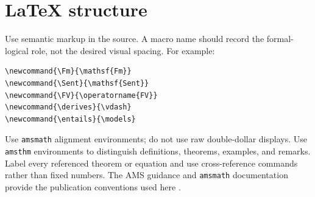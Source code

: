 \section{LaTeX structure}
\label{sec:latex-style-03}

Use semantic markup in the source.  A macro name should record the formal-logical
role, not the desired visual spacing.  For example:
\begin{lstlisting}[language={[LaTeX]TeX},caption={Semantic macros for logic}]
\newcommand{\Fm}{\mathsf{Fm}}
\newcommand{\Sent}{\mathsf{Sent}}
\newcommand{\FV}{\operatorname{FV}}
\newcommand{\derives}{\vdash}
\newcommand{\entails}{\models}
\end{lstlisting}

Use \texttt{amsmath} alignment environments; do not use raw double-dollar
displays.  Use \texttt{amsthm} environments to distinguish definitions,
theorems, examples, and remarks.  Label every referenced theorem or equation
and use cross-reference commands rather than fixed numbers.  The AMS guidance
and \texttt{amsmath} documentation provide the publication conventions used
here \cite{AMSAuthorHandbook,AMSMathGuide}.

